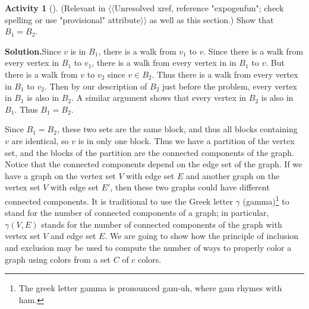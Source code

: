 \documentclass[10pt,]{book}
\theoremstyle{plain}
\theoremstyle{definition}
\newtheorem{activity}[project]{Activity}
\numberwithin{equation}{chapter}
\begin{document}
\begin{activity}[]\label{conncomp}
(Relevant in {$\langle\langle$Unresolved xref, reference "expogenfun"; check spelling or use "provisional" attribute$\rangle\rangle$} as well as this section.) Show that \(B_1=B_2\).%
\par\medskip\noindent%
\textbf{Solution.}\quad Since \(v\) is in \(B_1\), there is a walk from \(v_1\) to \(v\). Since there is a walk from every vertex in \(B_1\) to \(v_1\), there is a walk from every vertex in in \(B_1\) to \(v\). But there is a walk from \(v\) to \(v_2\) since \(v\in B_2\). Thus there is a walk from every vertex in \(B_1\) to \(v_2\). Then by our description of \(B_2\) just before the problem, every vertex in \(B_1\) is also in \(B_2\). A similar argument shows that every vertex in \(B_2\) is also in \(B_1\). Thus \(B_1=B_2\).%
\end{activity}
Since \(B_1=B_2\), these two sets are the same block, and thus all blocks containing \(v\) are identical, so \(v\) is in only one block. Thus we have a partition of the vertex set, and the blocks of the partition are the connected components of the graph. Notice that the connected components depend on the edge set of the graph. If we have a graph on the vertex set \(V\) with edge set \(E\) and another graph on the vertex set \(V\) with edge set \(E'\), then these two graphs could have different connected components. It is traditional to use the Greek letter \(\gamma\) (gamma)\footnote{The greek  letter gamma is pronounced gam-uh, where gam rhymes with ham.\label{fn-8}} to stand for the number of connected components of a graph; in particular, \(\gamma(V,E)\) stands for the number of connected components of the graph with vertex set \(V\) and edge set \(E\). We are going to show how the principle of inclusion and exclusion may be used to compute the number of ways to properly color a graph using colors from a set \(C\) of \(c\) colors.%
\end{document}

